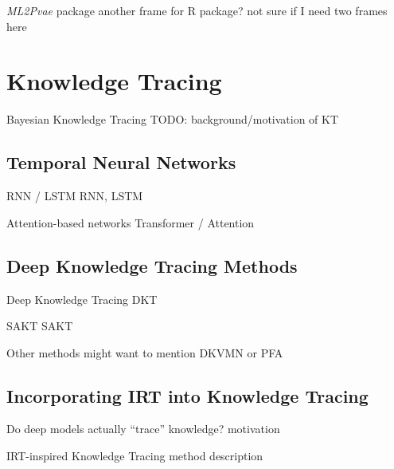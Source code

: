 \documentclass{beamer}
\theoremstyle{definition}
\begin{document}
\begin{frame}{\textit{ML2Pvae} package}
  another frame for R package? not sure if I need two frames here
\end{frame}


\section{Knowledge Tracing}

\begin{frame}{Bayesian Knowledge Tracing}
  TODO: background/motivation of KT
\end{frame}

\subsection{Temporal Neural Networks}
\begin{frame}{RNN / LSTM}
  RNN, LSTM 
\end{frame}

\begin{frame}{Attention-based networks}
  Transformer / Attention
\end{frame}

\subsection{Deep Knowledge Tracing Methods}
\begin{frame}{Deep Knowledge Tracing}
  DKT
\end{frame}

\begin{frame}{SAKT}
  SAKT
\end{frame}

\begin{frame}{Other methods}
  might want to mention DKVMN or PFA
\end{frame}

\subsection{Incorporating IRT into Knowledge Tracing}
\begin{frame}{Do deep models actually ``trace'' knowledge?}
  motivation
\end{frame}

\begin{frame}{IRT-inspired Knowledge Tracing}
  method description
\end{frame}
\end{document}
